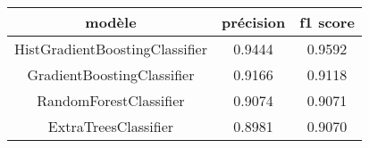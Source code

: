 \begin{tabular}{|c|c|c|}
\hline
modèle & précision & f1 score\\ 
 \hline 
HistGradientBoostingClassifier & 0.9444 & 0.9592\\ 
 \hline 
GradientBoostingClassifier & 0.9166 & 0.9118\\ 
 \hline 
RandomForestClassifier & 0.9074 & 0.9071\\ 
 \hline 
ExtraTreesClassifier & 0.8981 & 0.9070\\ 
 \hline 
\end{tabular}